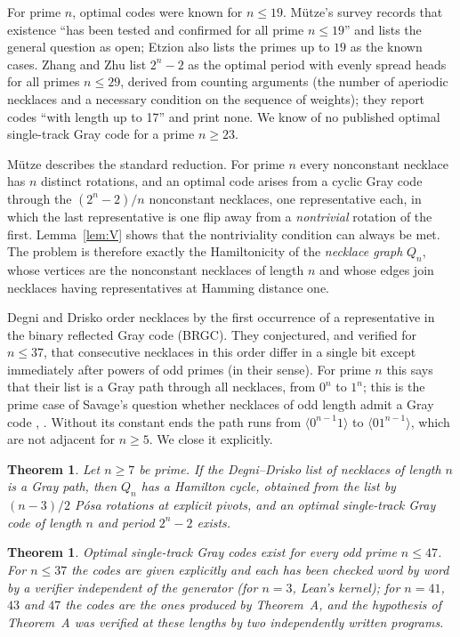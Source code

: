 \documentclass[journal,onecolumn,11pt]{IEEEtran}
\newtheorem{theoremA}{Theorem}
\newtheorem{theoremB}{Theorem}
\begin{document}
For prime $n$, optimal codes were known for $n\le 19$. M\"utze's survey \cite[Section 3.12]{Mut} records that existence
``has been tested and confirmed for all prime $n\le 19$'' and lists the general question as open; Etzion
\cite{Etz25} also lists the primes up to $19$ as the known cases. Zhang and Zhu \cite{ZZ08} list $2^n-2$ as the optimal
period with evenly spread heads for all primes $n\le 29$, derived from counting arguments (the number of aperiodic
necklaces and a necessary condition on the sequence of weights); they report codes ``with length up to 17'' and print
none. We know of no published optimal single-track Gray code for a prime $n\ge 23$.

M\"utze \cite[Section 3.12]{Mut} describes the standard reduction. For prime $n$ every nonconstant necklace has $n$
distinct rotations, and an optimal code arises from a cyclic Gray code through the $(2^n-2)/n$ nonconstant necklaces,
one representative each, in which the last representative is one flip away from a \emph{nontrivial} rotation of the
first. Lemma~\ref{lem:V} shows that the nontriviality condition can always be met. The problem is therefore exactly the
Hamiltonicity of the \emph{necklace graph} $Q_n$, whose vertices are the nonconstant necklaces of length $n$ and whose
edges join necklaces having representatives at Hamming distance one.

Degni and Drisko \cite{DD07} order necklaces by the first occurrence of a representative in the binary reflected Gray
code (BRGC). They conjectured, and verified for $n\le 37$, that consecutive necklaces in this order differ in a single
bit except immediately after powers of odd primes (in their sense). For prime $n$ this says that their list is a Gray
path through all necklaces, from $0^n$ to $1^n$; this is the prime case of Savage's question whether necklaces of odd
length admit a Gray code \cite{Sav97}, \cite[Problem P17]{Mut}. Without its constant ends the path runs from
$\langle 0^{n-1}1\rangle$ to $\langle 01^{n-1}\rangle$, which are not adjacent for $n\ge 5$. We close it
explicitly.

\begin{theoremA}
Let $n\ge 7$ be prime. If the Degni--Drisko list of necklaces of length $n$ is a Gray path, then $Q_n$ has a Hamilton
cycle, obtained from the list by $(n-3)/2$ P\'osa rotations at explicit pivots, and an optimal single-track Gray code
of length $n$ and period $2^n-2$ exists.
\end{theoremA}

\begin{theoremB}
Optimal single-track Gray codes exist for every odd prime $n\le 47$. For $n\le 37$ the codes are given explicitly and
each has been checked word by word by a verifier independent of the generator (for $n=3$, Lean's kernel); for $n=41$, $43$ and $47$ the codes are the ones
produced by Theorem~A, and the hypothesis of Theorem~A was verified at these lengths by two independently written
programs.
\end{theoremB}
\end{document}
